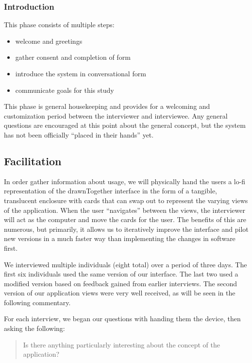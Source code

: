 \documentclass{www2010-submission}
\begin{document}
\subsubsection{ Introduction }

This phase consists of multiple steps:
\begin{itemize}
\item welcome and greetings
\item gather consent and completion of form
\item introduce the system in conversational form
\item communicate goals for this study
\end{itemize}

This phase is general housekeeping and provides for a welcoming and
customization period between the interviewer and interviewee.  Any general
questions are encouraged at this point about the general concept, but the
system has not been officially ``placed in their hands'' yet.

\subsection{ Facilitation }

In order gather information about usage, we will physically hand the users a
lo-fi representation of the drawnTogether interface in the form of a tangible,
translucent enclosure with cards that can swap out to represent the varying
views of the application.  When the user ``navigates'' between the views, the
interviewer will act as the computer and move the cards for the user.  The
benefits of this are numerous, but primarily, it allows us to iteratively
improve the interface and pilot new versions in a much faster way than
implementing the changes in software first.

We interviewed multiple individuals (eight total) over a period of three days.
The first six individuals used the same version of our interface.  The last two
used a modified version based on feedback gained from earlier interviews.  The
second version of our application views were very well received, as will be
seen in the following commentary.

For each interview, we began our questions with handing them the device, then
asking the following:
\begin{quote}
Is there anything particularly interesting about the concept of the
application?
\end{quote}
\end{document}
